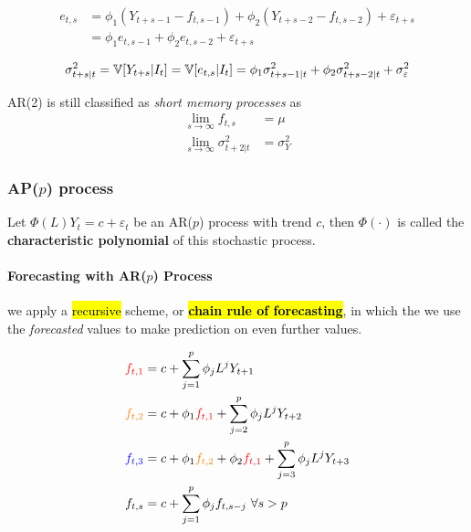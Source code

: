 \documentclass[11pt]{article}
\begin{document}
				\begin{align}
					e_{t, s} &= \phi_1(Y_{t+s-1} - f_{t, s-1}) + \phi_2(Y_{t+s-2} - f_{t, s-2}) + \varepsilon_{t+s} \\
					&= \phi_1 e_{t, s-1} + \phi_2 e_{t, s-2} + \varepsilon_{t+s}
				\end{align}
				
				\begin{align}
					\sigma_{t+s|t}^2 = \mathbb{V}[{Y_{t+s}|I_t}]
					= \mathbb{V}[{e_{t,s}|I_t}]
					= \phi_1 \sigma_{t+s-1|t}^2 + \phi_2 \sigma_{t+s-2|t}^2 + \sigma_\varepsilon^2
				\end{align}
			\begin{remark}
				AR(2) is still classified as \emph{short memory processes} as 
				\begin{align}
					\lim_{s \to \infty} f_{t, s} &= \mu \\
					\lim_{s \to \infty} \sigma_{t+2|t}^2 &= \sigma_Y^2
				\end{align}
			\end{remark}
			
		\subsubsection{AP($p$) process}
			\begin{definition}
				Let $\Phi(L)Y_t = c + \varepsilon_t$ be an AR($p$) process with trend $c$, then $\Phi(\cdot)$ is called the \textbf{characteristic polynomial} of this stochastic process.
			\end{definition}
			
			\begin{theorem}
			\end{theorem}
			
			\paragraph{Forecasting with AR($p$) Process} we apply a \hl{recursive} scheme, or \hl{\textbf{chain rule of forecasting}}, in which the we use the \emph{forecasted} values to make prediction on even further values.
			\begin{example}
				\begin{align}
					\red{f_{t,1}} &= c + \sum_{j=1}^p \phi_j L^j Y_{t+1} \\
					\orange{f_{t,2}} &= c + \phi_1 \red{f_{t,1}} + \sum_{j=2}^p \phi_j L^j Y_{t+2} \\
					\blue{f_{t,3}} &= c + \phi_1 \orange{f_{t,2}} + \phi_2 \red{f_{t,1}} + \sum_{j=3}^p \phi_j L^j Y_{t+3}\\
					f_{t, s} &= c + \sum_{j=1}^p \phi_j f_{t, s-j}\ \forall s > p
				\end{align}
			\end{example}
		
\end{document}

